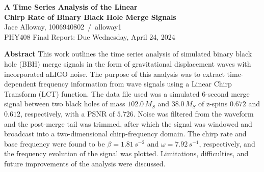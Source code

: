 \documentclass[12pt]{article}
\begin{document}
\begin{center}
    \Large {}  \textbf{A Time Series Analysis of the Linear\\  Chirp Rate of Binary Black Hole Merge Signals}\\
    \vspace{5pt} 
    \normalsize Jace Alloway, 1006940802\, /\, alloway1\\ PHY408 Final Report: Due Wednesday, April 24, 2024

    \vspace{20pt}
\begin{minipage}{40em}
    \textbf{Abstract} \hspace{10pt} This work outlines the time series analysis of simulated binary black hole (BBH) merge signals in the form of gravitational displacement waves with incorporated aLIGO noise. The purpose of this analysis was to extract time-dependent frequency information from wave signals using a Linear Chirp Transform (LCT) function. The data file used was a simulated 6-second merge signal between two black holes of mass $102.0\, M_S$ and $38.0\, M_S$ of z-spins $0.672$ and $0.612$, respectively, with a PSNR of $5.726$. Noise was filtered from the waveform and the post-merge tail was trimmed, after which the signal was windowed and broadcast into a two-dimensional chirp-frequency domain. The chirp rate and base frequency were found to be $\beta = 1.81\,s^{-2}$ and $\omega = 7.92\, s^{-1}$, respectively, and the frequency evolution of the signal was plotted. Limitations, difficulties, and future improvements of the analysis were discussed. 
\end{minipage}
\vspace{20pt}
\end{center}

\nd \hrulefill  

\vspace{10pt}
\end{document}
